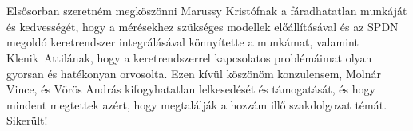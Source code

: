 \chapter*{\koszonetnyilvanitas}
Elsősorban szeretném megköszönni Marussy Kristófnak a fáradhatatlan munkáját és kedvességét, hogy a mérésekhez szükséges modellek előállításával és az SPDN megoldó keretrendszer integrálásával könnyítette a munkámat, valamint \mbox{Klenik Attilának}, hogy a keretrendszerrel kapcsolatos problémáimat olyan gyorsan és hatékonyan orvosolta. Ezen kívül köszönöm konzulensem, Molnár Vince, és Vörös András kifogyhatatlan lelkesedését és támogatását, és hogy mindent megtettek azért, hogy megtalálják a hozzám illő szakdolgozat témát. Sikerült!